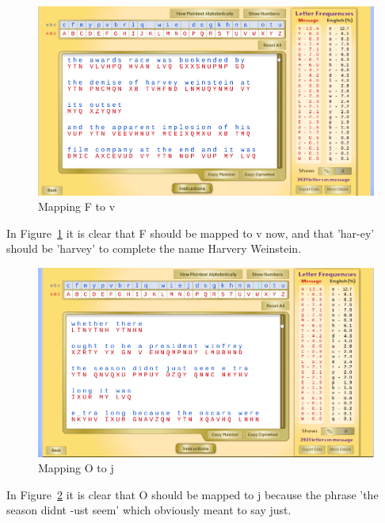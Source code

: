 \documentclass[12pt]{article}
\begin{document}
\begin{figure}[H]
    \begin{center}
        \includegraphics[scale=0.48]{c16.png}
    \end{center}{}
    \caption{Mapping F to v}
    \label{fig:c16}
\end{figure}

In Figure~\ref{fig:c16} it is clear that F should be mapped to v now, and that 'har-ey' should be 'harvey' to complete
the name Harvery Weinstein.


\begin{figure}[H]
    \begin{center}
        \includegraphics[scale=0.48]{c17.png}
    \end{center}{}
    \caption{Mapping O to j}
    \label{fig:c17}
\end{figure}

In Figure~\ref{fig:c17} it is clear that O should be mapped to j because the phrase 'the season didnt -ust seem' which
obviously meant to say just.
\end{document}
